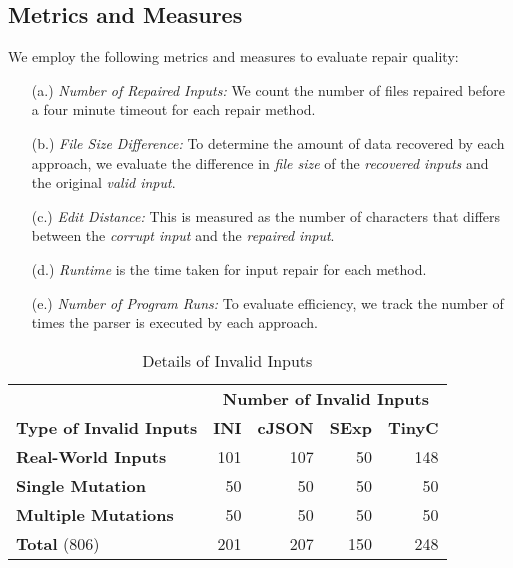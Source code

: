 \documentclass[acmsmall,screen,review,anonymous]{acmart}
\begin{document}
\subsection{Metrics and Measures} We employ the following metrics and measures to evaluate repair quality: 

\begin{itemize}

\item[(a.)] \textit{Number of Repaired Inputs:} We count the number of files repaired before
a four minute timeout for each repair method.
 
\item[(b.)]  \textit{File Size Difference:} To determine the amount of data recovered by each approach, 
we evaluate the difference in \emph{file size} of
the \emph{recovered inputs} and the original
\emph{valid input}. %

\item[(c.)]  \textit{Edit Distance:} This is measured as the number of characters that
differs between the \emph{corrupt input} and the \emph{repaired input}.

\item[(d.)]  \textit{Runtime} is the time taken for input repair for each method.

\item[(e.)]  \textit{Number of Program Runs:} To evaluate efficiency, we track the number of times the parser is executed by each approach. 

\end{itemize}



\begin{table}[!tbp]\centering
\caption{Details of Invalid 
Inputs}
\begin{tabular}{|l | r | r | r | r |}
\hline
&  \multicolumn{4}{c|}{\textbf{Number of Invalid Inputs}}  \\
\textbf{Type of Invalid Inputs} & \textbf{INI} & \textbf{cJSON} & \textbf{SExp} & \textbf{TinyC} \\
\hline
\textbf{Real-World Inputs} & 101 & 107 & 50 & 148 \\
\textbf{Single Mutation} & 50 & 50 & 50 & 50 \\
\textbf{Multiple Mutations} & 50 & 50 & 50 & 50 \\
\hline
\textbf{Total } (806) & 201 & 207 & 150 & 248 \\
\hline
\end{tabular}
\label{tab:input-details}
\end{table}
\end{document}
